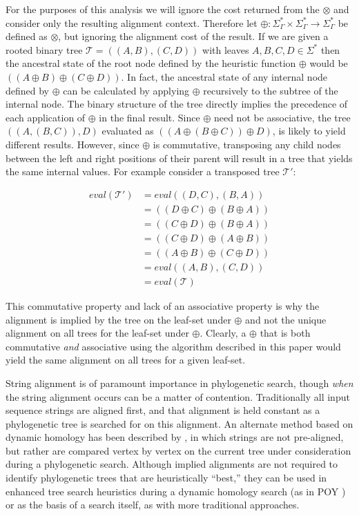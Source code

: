 \documentclass{bmcart}
\begin{document}
For the purposes of this analysis we will ignore the cost returned from the $\otimes$ and consider only the resulting alignment context.
Therefore let $\oplus : \Sigma^{*}_{\Gamma} \times \Sigma^{*}_{\Gamma} \rightarrow \Sigma^{*}_{\Gamma}$ be defined as $\otimes$, but ignoring the alignment cost of the result. If we are given a rooted binary tree $\mathcal{T} = ((A,B),(C,D))$ with leaves $A, B, C, D \in \Sigma^{*}$ then the ancestral state of the root node defined by the heuristic function $\oplus$ would be $((A \oplus B) \oplus (C \oplus D))$. 
In fact, the ancestral state of any internal node defined by $\oplus$ can be calculated by applying $\oplus$ recursively to the subtree of the internal node.
The binary structure of the tree directly implies the precedence of each application of $\oplus$ in the final result.
Since $\oplus$ need not be associative, the tree $((A,(B,C)),D)$ evaluated as $((A \oplus (B \oplus C)) \oplus D)$, is likely to yield different results.
However, since $\oplus$ is commutative, transposing any child nodes between the left and right positions of their parent will result in a tree that yields the same internal values. 
For example consider a transposed tree $\mathcal{T'}$:

\begin{align*}
  eval(\mathcal{T'}) &= eval((D,C),(B,A))
\\  &= ((D \oplus C) \oplus (B \oplus A))
\\  &= ((C \oplus D) \oplus (B \oplus A))
\\  &= ((C \oplus D) \oplus (A \oplus B))
\\  &= ((A \oplus B) \oplus (C \oplus D))
\\  &= eval((A,B),(C,D))
\\  &= eval(\mathcal{T})
\end{align*}

This commutative property and lack of an associative property is why the alignment is implied by the tree on the leaf-set under $\oplus$ and not the unique alignment on all trees for the leaf-set under $\oplus$.
Clearly, a $\oplus$ that is both commutative \emph{and} associative using the algorithm described in this paper would yield the same alignment on all trees for a given leaf-set.

String alignment is of paramount importance in phylogenetic search, though \textit{when} the string alignment occurs can be a matter of contention.
Traditionally all input sequence strings are aligned first, and that alignment is held constant as a phylogenetic tree is searched for on this alignment.
An alternate method based on dynamic homology has been described by \citep{Wheeler1996}, in which strings are not pre-aligned, but rather are compared vertex by vertex on the current tree under consideration during a phylogenetic search.
Although implied alignments are not required to identify phylogenetic trees that are heuristically ``best,'' they can be used in enhanced tree search heuristics during a dynamic homology search (as in POY \citealp{POY5, Wheeleretal2015}) or as the basis of a search itself, as with more traditional approaches.
\end{document}
